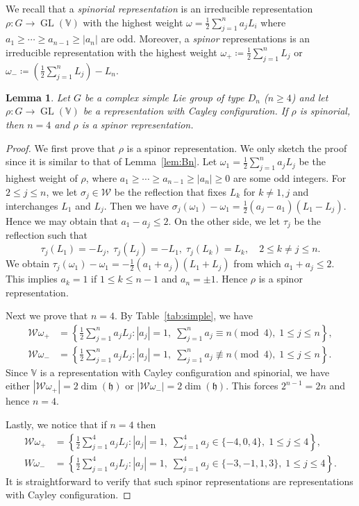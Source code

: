 \documentclass[11pt,reqno]{amsart}
\DeclareMathOperator{\GL}{GL}
\newtheorem{lemma}[theorem]{Lemma}
\newcommand{\W}{\mathcal{W}}
\begin{document}
We recall that a \emph{spinorial representation} is an irreducible representation $\rho: G \to \GL(\mathbb{V})$ with the highest weight $\omega = \frac{1}{2}\sum_{j=1}^{n} a_j L_i$ where $a_1 \ge \cdots \ge a_{n-1} \ge |a_n|$ are odd.  Moreover,   a \emph{spinor} representations is an irreducible representation with the highest weight $\omega_+ \coloneqq \frac{1}{2} \sum_{j=1}^n L_j$ or $\omega_- \coloneqq \left( \frac{1}{2}  \sum_{j=1}^{n} L_j \right) - L_n$.
\begin{lemma}\label{lem:spinorDn}
Let $G$ be a complex simple Lie group of type $D_n$ ($n\ge 4$) and let $\rho: G \to \GL(\mathbb{V})$ be a representation with Cayley configuration.  If $\rho$ is spinorial,  then $n = 4$ and $\rho$ is a spinor representation. 
\end{lemma}
\begin{proof}
We first prove that $\rho$ is a spinor representation.  We only sketch the proof since it is similar to that of Lemma~\ref{lem:Bn}.  Let $\omega_1 = \frac{1}{2}\sum_{j=1}^{n} a_j L_j$ be the highest weight of $\rho$,  where $a_1 \ge \cdots \ge a_{n-1} \ge |a_n| \ge 0$ are some odd integers.  For $2 \le j \le n$,  we let $\sigma_j \in \W$ be the reflection that fixes $L_k$ for $k\ne 1, j$ and interchanges $L_1$ and $L_j$.  Then we have $\sigma_j (\omega_1) - \omega_1 = \frac{1}{2}(a_j - a_1)(L_1 - L_j)$.  Hence we may obtain that $a_1 - a_j \le 2$.  On the other side,  we let $\tau_j$ be the reflection such that 
\[
\tau_j(L_1) = -L_j,\; \tau_j(L_j) = -L_1,\; \tau_j (L_k) = L_k,\quad 2 \le k \ne j \le n.
\]
We obtain $\tau_j(\omega_1) - \omega_1 =- \frac{1}{2}(a_1+ a_j)(L_1 + L_j)$ from which $a_1 + a_j \le 2$.  This implies $a_k = 1$ if $1 \le k \le n-1$ and $a_n = \pm 1$.  Hence $\rho$ is a spinor representation.  

Next we prove that $n = 4$.  By Table~\ref{tab:simple},  we have 
\begin{align*}
\W \omega_+ &= \left\lbrace
\frac{1}{2} \sum_{j=1}^{n} a_j L_j: |a_j| = 1,\; \sum_{j=1}^n a_j \equiv n \pmod{4}, \; 1\le j \le n 
\right\rbrace,\\ 
\W \omega_- &= \left\lbrace
\frac{1}{2} \sum_{j=1}^{n} a_j L_j: |a_j| = 1,\; \sum_{j=1}^n a_j \not\equiv  n \pmod{4},  \; 1 \le j \le n 
\right\rbrace.
\end{align*}
Since $\mathbb{V}$ is a representation with Cayley configuration and spinorial,  we have either $|\W \omega_+| = 2 \dim (\mathfrak{h})$ or $|\W \omega_-| = 2 \dim (\mathfrak{h})$.  This forces $2^{n-1}=2n$ and hence $n = 4$.  

Lastly,  we notice that if $n = 4$ then
\begin{align*}
\W \omega_+ &= \left\lbrace
\frac{1}{2} \sum_{j=1}^4 a_j L_j: |a_j| = 1, \; \sum_{j=1}^4 a_j \in \{-4,  0,4\}, \;  1 \le j \le 4
\right\rbrace,  \\
W \omega_- &= \left\lbrace
\frac{1}{2} \sum_{j=1}^4 a_j L_j: |a_j| = 1, \; \sum_{j=1}^4 a_j \in \{-3,-1, 1,3\}, \;  1 \le j \le 4
\right\rbrace.  
\end{align*}
It is straightforward to verify that such spinor representations are representations with Cayley configuration.
\end{proof}
\end{document}
